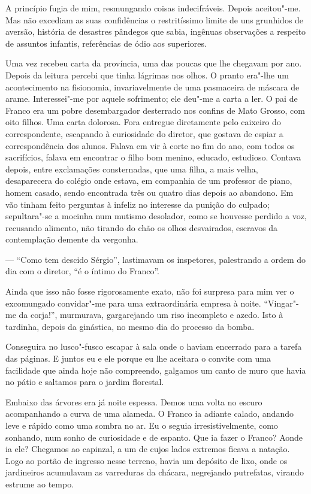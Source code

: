 A princípio fugia de mim, resmungando coisas
indecifráveis. Depois aceitou"-me. Mas não excediam as suas
confidências o restritíssimo limite de uns grunhidos de aversão,
história de desastres pândegos que sabia, ingênuas observações a
respeito de assuntos infantis, referências de ódio aos superiores. 

Uma vez recebeu carta da província, uma das poucas que lhe chegavam por
ano. Depois da leitura percebi que tinha lágrimas nos olhos. O pranto
era"-lhe um acontecimento na fisionomia, invariavelmente de uma
pasmaceira de máscara de arame. Interessei"-me por aquele sofrimento;
ele deu"-me a carta a ler. O pai de Franco era um pobre desembargador
desterrado nos confins de Mato Grosso, com oito filhos. Uma carta
dolorosa. Fora entregue diretamente pelo caixeiro do correspondente,
escapando à curiosidade do diretor, que gostava de espiar a
correspondência dos alunos. Falava em vir à corte no fim do ano, com
todos os sacrifícios, falava em encontrar o filho bom menino, educado,
estudioso. Contava depois, entre exclamações consternadas, que uma
filha, a mais velha, desaparecera do colégio onde estava, em companhia
de um professor de piano, homem casado, sendo encontrada três ou quatro
dias depois ao abandono. Em vão tinham feito perguntas à infeliz no
interesse da punição do culpado; sepultara"-se a mocinha num mutismo
desolador, como se houvesse perdido a voz, recusando alimento, não
tirando do chão os olhos desvairados, escravos da contemplação demente da vergonha. 

--- ``Como tem descido Sérgio'', lastimavam os inspetores, 
palestrando a ordem do dia com o diretor, ``é o íntimo do Franco''. 

Ainda que isso não fosse rigorosamente exato, não foi
surpresa para mim ver o excomungado convidar"-me para uma
extraordinária empresa à noite. ``Vingar"-me da corja!'', murmurava,
gargarejando um riso incompleto e azedo. Isto à tardinha, depois da
ginástica, no mesmo dia do processo da bomba. 

Conseguira no lusco"-fusco escapar à sala onde o haviam encerrado para a 
tarefa das páginas. E juntos eu e ele porque eu lhe aceitara o convite com uma
facilidade que ainda hoje não compreendo, galgamos um canto de muro que
havia no pátio e saltamos para o jardim florestal. 

Embaixo das árvores
era já noite espessa. Demos uma volta no escuro acompanhando a curva de
uma alameda. O Franco ia adiante calado, andando leve e rápido como uma
sombra no ar. Eu o seguia irresistivelmente, como sonhando, num sonho
de curiosidade e de espanto. Que ia fazer o Franco? Aonde ia ele?
Chegamos ao capinzal, a um de cujos lados extremos ficava a natação.
Logo ao portão de ingresso nesse terreno, havia um depósito de lixo,
onde os jardineiros acumulavam as varreduras da chácara, negrejando
putrefatas, virando estrume ao tempo. 

